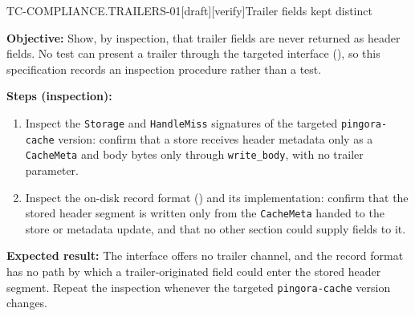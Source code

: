 \begin{requirement}{TC-COMPLIANCE.TRAILERS-01}[draft][verify]{Trailer fields kept distinct}


  \textbf{Objective:} Show, by inspection, that trailer fields are never
  returned as header fields. No test can present a trailer through the
  targeted interface (), so this
  specification records an inspection procedure rather than a test.

  \textbf{Steps (inspection):}
  \begin{enumerate}
    \item Inspect the \texttt{Storage} and \texttt{HandleMiss} signatures of
      the targeted \texttt{pingora-cache} version: confirm that a store
      receives header metadata only as a \texttt{CacheMeta} and body bytes
      only through \texttt{write\_body}, with no trailer parameter.
    \item Inspect the on-disk record format
      () and its implementation: confirm
      that the stored header segment is written only from the
      \texttt{CacheMeta} handed to the store or metadata update, and that no
      other section could supply fields to it.
  \end{enumerate}

  \textbf{Expected result:} The interface offers no trailer channel, and
  the record format has no path by which a trailer-originated field could
  enter the stored header segment. Repeat the inspection whenever the
  targeted \texttt{pingora-cache} version changes.



\end{requirement}

